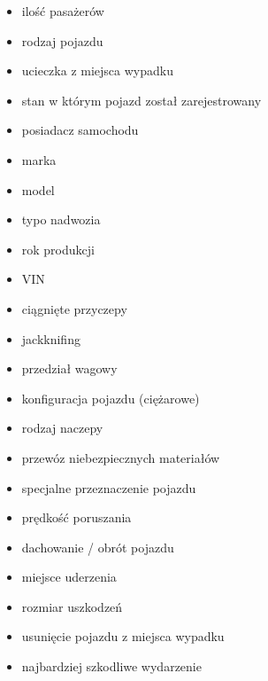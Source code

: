 \begin{itemize}
\itemsep1pt\parskip0pt
\item
  ilość pasażerów\\
\item
  rodzaj pojazdu\\
\item
  ucieczka z miejsca wypadku\\
\item
  stan w którym pojazd został zarejestrowany\\
\item
  posiadacz samochodu\\
\item
  marka\\
\item
  model\\
\item
  typo nadwozia\\
\item
  rok produkcji\\
\item
  VIN\\
\item
  ciągnięte przyczepy\\
\item
  jackknifing\\
\item
  przedział wagowy\\
\item
  konfiguracja pojazdu (ciężarowe)\\
\item
  rodzaj naczepy\\
\item
  przewóz niebezpiecznych materiałów\\
\item
  specjalne przeznaczenie pojazdu\\
\item
  prędkość poruszania\\
\item
  dachowanie / obrót pojazdu\\
\item
  miejsce uderzenia\\
\item
  rozmiar uszkodzeń\\
\item
  usunięcie pojazdu z miejsca wypadku\\
\item
  najbardziej szkodliwe wydarzenie\\

\end{itemize}
